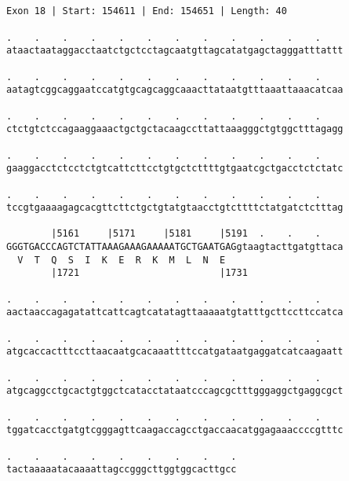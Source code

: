 \documentclass{article}
\begin{document}
\begin{Verbatim}
                  
 
Exon 18 | Start: 154611 | End: 154651 | Length: 40
 
.    .    .    .    .    .    .    .    .    .    .    .    
ataactaataggacctaatctgctcctagcaatgttagcatatgagctagggatttattt
                                                            
.    .    .    .    .    .    .    .    .    .    .    .    
aatagtcggcaggaatccatgtgcagcaggcaaacttataatgtttaaattaaacatcaa
                                                            
.    .    .    .    .    .    .    .    .    .    .    .    
ctctgtctccagaaggaaactgctgctacaagccttattaaagggctgtggctttagagg
                                                            
.    .    .    .    .    .    .    .    .    .    .    .    
gaaggacctctcctctgtcattcttcctgtgctcttttgtgaatcgctgacctctctatc
                                                            
.    .    .    .    .    .    .    .    .    .    .    .    
tccgtgaaaagagcacgttcttctgctgtatgtaacctgtcttttctatgatctctttag
                                                            
        |5161     |5171     |5181     |5191  .    .    .    
GGGTGACCCAGTCTATTAAAGAAAGAAAAATGCTGAATGAGgtaagtacttgatgttaca
  V  T  Q  S  I  K  E  R  K  M  L  N  E                     
        |1721                         |1731                 
  
.    .    .    .    .    .    .    .    .    .    .    .    
aactaaccagagatattcattcagtcatatagttaaaaatgtatttgcttccttccatca
                                                            
.    .    .    .    .    .    .    .    .    .    .    .    
atgcaccactttccttaacaatgcacaaattttccatgataatgaggatcatcaagaatt
                                                            
.    .    .    .    .    .    .    .    .    .    .    .    
atgcaggcctgcactgtggctcatacctataatcccagcgctttgggaggctgaggcgct
                                                            
.    .    .    .    .    .    .    .    .    .    .    .    
tggatcacctgatgtcgggagttcaagaccagcctgaccaacatggagaaaccccgtttc
                                                            
.    .    .    .    .    .    .    .    .
tactaaaaatacaaaattagccgggcttggtggcacttgcc
                                         

\end{Verbatim}
\end{document}
